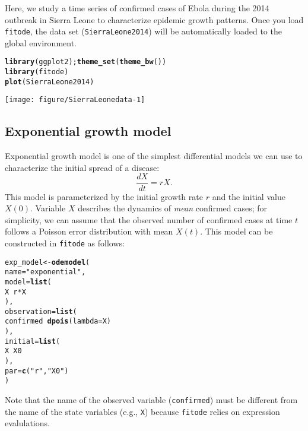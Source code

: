 \documentclass{article}\usepackage[]{graphicx}\usepackage[]{color}
\makeatletter
\def\maxwidth{ %
  \ifdim\Gin@nat@width>\linewidth
    \linewidth
  \else
    \Gin@nat@width
  \fi
}
\newcommand{\hlstr}[1]{\textcolor[rgb]{0.192,0.494,0.8}{#1}}%
\newcommand{\hlopt}[1]{\textcolor[rgb]{0,0,0}{#1}}%
\newcommand{\hlstd}[1]{\textcolor[rgb]{0.345,0.345,0.345}{#1}}%
\newcommand{\hlkwb}[1]{\textcolor[rgb]{0.69,0.353,0.396}{#1}}%
\newcommand{\hlkwc}[1]{\textcolor[rgb]{0.333,0.667,0.333}{#1}}%
\newcommand{\hlkwd}[1]{\textcolor[rgb]{0.737,0.353,0.396}{\textbf{#1}}}%
\newenvironment{kframe}{%
 \def\at@end@of@kframe{}%
 \ifinner\ifhmode%
  \def\at@end@of@kframe{\end{minipage}}%
  \begin{minipage}{\columnwidth}%
 \fi\fi%
 \def\FrameCommand##1{\hskip\@totalleftmargin \hskip-\fboxsep
 \colorbox{shadecolor}{##1}\hskip-\fboxsep
     \hskip-\linewidth \hskip-\@totalleftmargin \hskip\columnwidth}%
 \MakeFramed {\advance\hsize-\width
   \@totalleftmargin\z@ \linewidth\hsize
   \@setminipage}}%
 {\par\unskip\endMakeFramed%
 \at@end@of@kframe}
\newenvironment{knitrout}{}{} %
\makeatother
\begin{document}
Here, we study a time series of confirmed cases of Ebola during the 2014 outbreak in
Sierra Leone to characterize epidemic growth patterns. Once you load \texttt{fitode},
the data set (\texttt{SierraLeone2014}) will be automatically loaded to the global
environment.
\begin{knitrout}
\color{fgcolor}\begin{kframe}
\begin{alltt}
\hlkwd{library}\hlstd{(ggplot2);} \hlkwd{theme_set}\hlstd{(}\hlkwd{theme_bw}\hlstd{())}
\hlkwd{library}\hlstd{(fitode)}
\hlkwd{plot}\hlstd{(SierraLeone2014)}
\end{alltt}
\end{kframe}
\texttt{[image: figure/SierraLeonedata-1]} 

\end{knitrout}

\subsection{Exponential growth model}

Exponential growth model is one of the simplest differential models we can use to
characterize the initial spread of a disease:
\begin{equation}
\frac{dX}{dt} = rX.
\end{equation}
This model is parameterized by the initial growth rate $r$ and the initial value $X(0)$.
Variable $X$ describes the dynamics of \emph{mean} confirmed cases;
for simplicity, we can assume that the observed number of confirmed cases at time $t$ follows a
Poisson error distribution with mean $X(t)$. This model can be constructed in \texttt{fitode} as
follows:
\begin{knitrout}
\color{fgcolor}\begin{kframe}
\begin{alltt}
\hlstd{exp_model} \hlkwb{<-} \hlkwd{odemodel}\hlstd{(}
    \hlkwc{name}\hlstd{=}\hlstr{"exponential"}\hlstd{,}
    \hlkwc{model}\hlstd{=}\hlkwd{list}\hlstd{(}
        \hlstd{X} \hlopt{~} \hlstd{r} \hlopt{*} \hlstd{X}
    \hlstd{),}
    \hlkwc{observation}\hlstd{=}\hlkwd{list}\hlstd{(}
        \hlstd{confirmed} \hlopt{~} \hlkwd{dpois}\hlstd{(}\hlkwc{lambda}\hlstd{=X)}
    \hlstd{),}
    \hlkwc{initial}\hlstd{=}\hlkwd{list}\hlstd{(}
        \hlstd{X} \hlopt{~} \hlstd{X0}
    \hlstd{),}
    \hlkwc{par}\hlstd{=}\hlkwd{c}\hlstd{(}\hlstr{"r"}\hlstd{,} \hlstr{"X0"}\hlstd{)}
\hlstd{)}
\end{alltt}
\end{kframe}
\end{knitrout}
Note that the name of the observed variable (\texttt{confirmed}) must be different
from the name of the state variables (e.g., \texttt{X}) because \texttt{fitode}
relies on expression evalulations.
\end{document}
